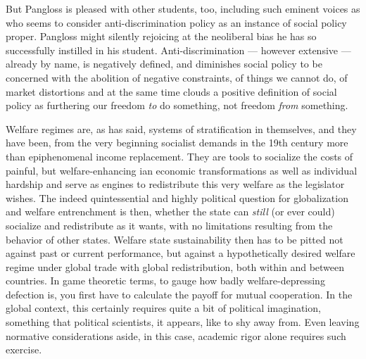\documentclass[11pt,a4paper,oneside,openright]{article}
\begin{document}

But Pangloss is pleased with other students, too, including such eminent voices as \cite{Leibfried-2005-aa} who seems to consider anti-discrimination policy as an instance of social policy proper. 
Pangloss might silently rejoicing at the neoliberal bias he has so successfully instilled in his student. 
Anti-discrimination --- however extensive --- already by name, is negatively defined, and diminishes social policy to be concerned with the abolition of negative constraints, of things we cannot do, of market distortions and at the same time clouds a positive definition of social policy as furthering our freedom \emph{to} do something, not freedom \emph{from} something.
 
Welfare regimes are, as \cite{Esping-Andersen-1990-aa} has said, systems of stratification in themselves, and they have been, from the very beginning socialist demands in the 19th century more than epiphenomenal income replacement. 
They are tools to socialize the costs of painful, but welfare-enhancing \citeauthor{SchumpeterSwedberg-1942-aa}ian economic transformations as well as individual hardship and serve as engines to redistribute this very welfare as the legislator wishes. 
The indeed quintessential and highly political question for globalization and welfare entrenchment is then, whether the state can \emph{still} (or ever could) socialize and redistribute as it wants, with no limitations resulting from the behavior of other states. 
Welfare state sustainability then has to be pitted not against past or current performance, but against a hypothetically desired welfare regime under global trade with global redistribution, both within and between countries. 
In game theoretic terms, to gauge how badly welfare-depressing defection is, you first have to calculate the payoff for mutual cooperation.
In the global context, this certainly requires quite a bit of political imagination, something that political scientists, it appears, like to shy away from. 
Even leaving normative considerations aside, in this case, academic rigor alone requires such exercise.
\end{document}
